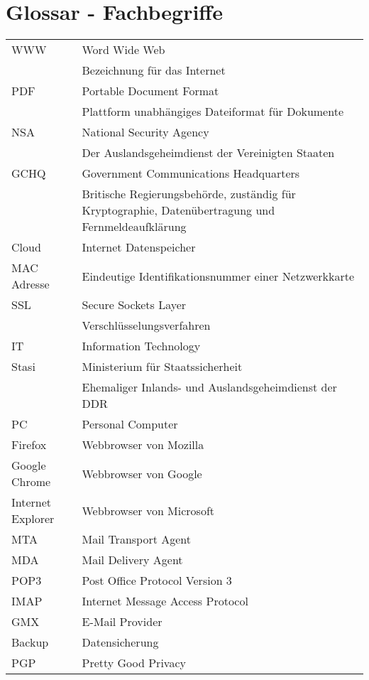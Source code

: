 \section{Glossar - Fachbegriffe}

\begin{tabular*}{\textwidth}{|p{}|p{}|}
  WWW & Word Wide Web \\
      & Bezeichnung für das Internet \\ \hline
  PDF & Portable Document Format \\
      & Plattform unabhängiges Dateiformat für Dokumente \\ \hline
  NSA & National Security Agency \\
      & Der Auslandsgeheimdienst der Vereinigten Staaten \\ \hline
  GCHQ & Government Communications Headquarters \\
       & Britische Regierungsbehörde, zuständig für Kryptographie, Datenübertragung und Fernmeldeaufklärung \\ \hline
  Cloud & Internet Datenspeicher \\ \hline
  MAC Adresse & Eindeutige Identifikationsnummer einer Netzwerkkarte \\ \hline
  SSL & Secure Sockets Layer \\
      & Verschlüsselungsverfahren \\ \hline
  IT & Information Technology \\ \hline
  Stasi & Ministerium für Staatssicherheit \\
        & Ehemaliger Inlands- und Auslandsgeheimdienst der DDR \\ \hline
  PC & Personal Computer \\ \hline
  Firefox & Webbrowser von Mozilla \\ \hline
  Google Chrome & Webbrowser von Google \\ \hline
  Internet Explorer & Webbrowser von Microsoft \\ \hline
  MTA & Mail Transport Agent \\ \hline
  MDA & Mail Delivery Agent \\ \hline
  POP3 & Post Office Protocol Version 3 \\ \hline
  IMAP & Internet Message Access Protocol \\ \hline
  GMX & E-Mail Provider \\ \hline
  Backup & Datensicherung \\ \hline
  PGP & Pretty Good Privacy \\ \hline

\end{tabular*}
